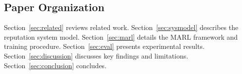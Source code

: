 \subsection{Paper Organization}

Section~\ref{sec:related} reviews related work.
Section~\ref{sec:sysmodel} describes the reputation system model.
Section~\ref{sec:marl} details the MARL framework and training procedure.
Section~\ref{sec:eval} presents experimental results.
Section~\ref{sec:discussion} discusses key findings and limitations.
Section~\ref{sec:conclusion} concludes.
